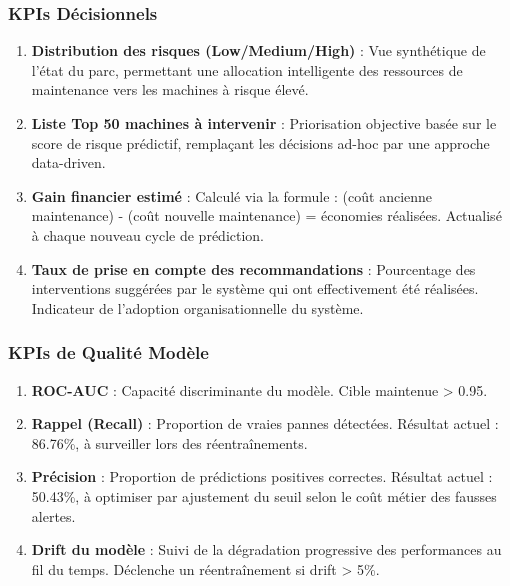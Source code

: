 \documentclass[a4paper,12pt]{report}
\begin{document}
\subsubsection{KPIs Décisionnels}

\begin{enumerate}
    \item \textbf{Distribution des risques (Low/Medium/High)} : Vue synthétique de l'état du parc, permettant une allocation intelligente des ressources de maintenance vers les machines à risque élevé.
    
    \item \textbf{Liste Top 50 machines à intervenir} : Priorisation objective basée sur le score de risque prédictif, remplaçant les décisions ad-hoc par une approche data-driven.
    
    \item \textbf{Gain financier estimé} : Calculé via la formule : (coût ancienne maintenance) - (coût nouvelle maintenance) = économies réalisées. Actualisé à chaque nouveau cycle de prédiction.
    
    \item \textbf{Taux de prise en compte des recommandations} : Pourcentage des interventions suggérées par le système qui ont effectivement été réalisées. Indicateur de l'adoption organisationnelle du système.
\end{enumerate}

\subsubsection{KPIs de Qualité Modèle}

\begin{enumerate}
    \item \textbf{ROC-AUC} : Capacité discriminante du modèle. Cible maintenue > 0.95.
    
    \item \textbf{Rappel (Recall)} : Proportion de vraies pannes détectées. Résultat actuel : 86.76\%, à surveiller lors des réentraînements.
    
    \item \textbf{Précision} : Proportion de prédictions positives correctes. Résultat actuel : 50.43\%, à optimiser par ajustement du seuil selon le coût métier des fausses alertes.
    
    \item \textbf{Drift du modèle} : Suivi de la dégradation progressive des performances au fil du temps. Déclenche un réentraînement si drift > 5\%.
\end{enumerate}
\end{document}
